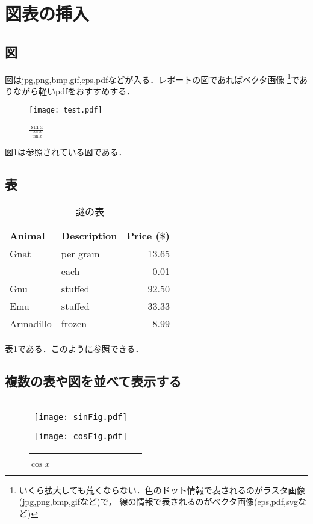 \documentclass[a4j,titlepage,dvipdfmx]{jsarticle}   %
\begin{document}
  \section{図表の挿入}
  \subsection{図}
  図はjpg,png,bmp,gif,eps,pdfなどが入る．レポートの図であればベクタ画像%
  \footnote{いくら拡大しても荒くならない．色のドット情報で表されるのがラスタ画像(jpg,png,bmp,gifなど)で，
  線の情報で表されるのがベクタ画像(eps,pdf,svgなど)}でありながら軽いpdfをおすすめする．
  \begin{figure}[H]
    \centering
    \texttt{[image: test.pdf]}
    \caption{$\frac{\sin{x}}{\frac{\cos{x}}{\tan{x}}}$}
    \label{fig:tri}
  \end{figure}
  図\ref{fig:tri}は参照されている図である．

  \subsection{表}
  \begin{table}[H]
    \centering
    \caption{謎の表}
    \label{tab:testTab}
    \begin{tabular}{|l|l|r|}
      \hline
      Animal      & Description  & Price (\$) \\ \hline
      Gnat        & per gram     & 13.65      \\ \hline
                  & each         & 0.01       \\ \hline
      Gnu         & stuffed      & 92.50      \\ \hline
      Emu         & stuffed      & 33.33      \\ \hline
      Armadillo   & frozen       & 8.99       \\ \hline
    \end{tabular}
  \end{table}
  表\ref{tab:testTab}である．このように参照できる．

  \subsection{複数の表や図を並べて表示する}
  \begin{figure}[H]
    \begin{tabular}{cc}
      \begin{minipage}{0.5\hsize}
        \centering
        \texttt{[image: sinFig.pdf]}
        \caption{$\sin{x}$}
        \label{fig:sin}
      \end{minipage}
      \begin{minipage}{0.5\hsize}
        \centering
        \texttt{[image: cosFig.pdf]}
        \caption{$\cos{x}$}
        \label{fig:cos}
      \end{minipage}
    \end{tabular}
  \end{figure}
\end{document}
